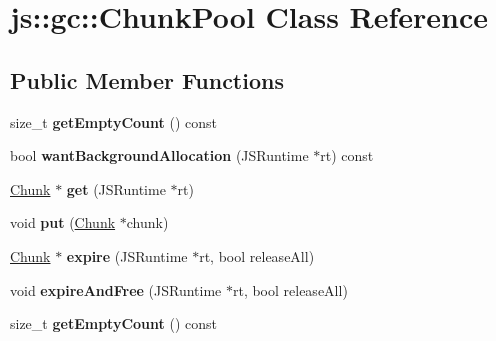 \hypertarget{classjs_1_1gc_1_1_chunk_pool}{\section{js\-:\-:gc\-:\-:Chunk\-Pool Class Reference}
\label{classjs_1_1gc_1_1_chunk_pool}
}
\subsection*{Public Member Functions}
\begin{DoxyCompactItemize}
\item 
\hypertarget{classjs_1_1gc_1_1_chunk_pool_a21e577785a5120d9d9371795fdb7b046}{size\-\_\-t {\bfseries get\-Empty\-Count} () const }\label{classjs_1_1gc_1_1_chunk_pool_a21e577785a5120d9d9371795fdb7b046}

\item 
\hypertarget{classjs_1_1gc_1_1_chunk_pool_a4829b5395e5a0b06fb37e70d8c561342}{bool {\bfseries want\-Background\-Allocation} (J\-S\-Runtime $\ast$rt) const }\label{classjs_1_1gc_1_1_chunk_pool_a4829b5395e5a0b06fb37e70d8c561342}

\item 
\hypertarget{classjs_1_1gc_1_1_chunk_pool_a45ec020ee6ff8ac4fb3e693d53dcb066}{\hyperlink{structjs_1_1gc_1_1_chunk}{Chunk} $\ast$ {\bfseries get} (J\-S\-Runtime $\ast$rt)}\label{classjs_1_1gc_1_1_chunk_pool_a45ec020ee6ff8ac4fb3e693d53dcb066}

\item 
\hypertarget{classjs_1_1gc_1_1_chunk_pool_aeed45d739b40644745b736e2c5bd1d0f}{void {\bfseries put} (\hyperlink{structjs_1_1gc_1_1_chunk}{Chunk} $\ast$chunk)}\label{classjs_1_1gc_1_1_chunk_pool_aeed45d739b40644745b736e2c5bd1d0f}

\item 
\hypertarget{classjs_1_1gc_1_1_chunk_pool_af34618bc7f19dd37113d5a01eb001b06}{\hyperlink{structjs_1_1gc_1_1_chunk}{Chunk} $\ast$ {\bfseries expire} (J\-S\-Runtime $\ast$rt, bool release\-All)}\label{classjs_1_1gc_1_1_chunk_pool_af34618bc7f19dd37113d5a01eb001b06}

\item 
\hypertarget{classjs_1_1gc_1_1_chunk_pool_a9402f74591b9b4a738fcac09b2a74271}{void {\bfseries expire\-And\-Free} (J\-S\-Runtime $\ast$rt, bool release\-All)}\label{classjs_1_1gc_1_1_chunk_pool_a9402f74591b9b4a738fcac09b2a74271}

\item 
\hypertarget{classjs_1_1gc_1_1_chunk_pool_a21e577785a5120d9d9371795fdb7b046}{size\-\_\-t {\bfseries get\-Empty\-Count} () const }\label{classjs_1_1gc_1_1_chunk_pool_a21e577785a5120d9d9371795fdb7b046}


\end{DoxyCompactItemize}
